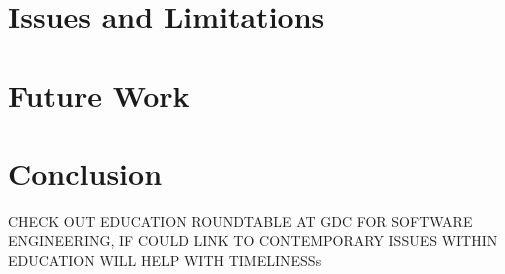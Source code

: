 \documentclass[journal]{IEEEtran}
\begin{document}
\section{Issues and Limitations}

\section{Future Work}

\section{Conclusion}

CHECK OUT EDUCATION ROUNDTABLE AT GDC FOR SOFTWARE ENGINEERING, IF COULD LINK TO CONTEMPORARY ISSUES WITHIN EDUCATION WILL HELP WITH TIMELINESSs


\end{document}
